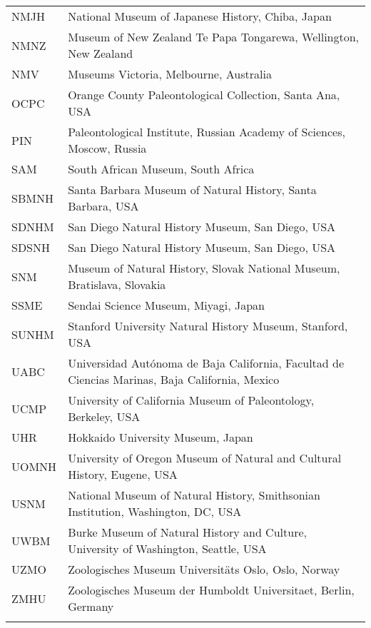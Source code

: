 \begin{longtable}{ll}
NMJH &
National Museum of Japanese History, Chiba, Japan\\
NMNZ &
Museum of New Zealand Te Papa Tongarewa, Wellington, New Zealand\\
NMV &
Museums Victoria, Melbourne, Australia\\
OCPC &
Orange County Paleontological Collection, Santa Ana, USA\\
PIN &
Paleontological Institute, Russian Academy of Sciences, Moscow, Russia\\
SAM &
South African Museum, South Africa\\
SBMNH &
Santa Barbara Museum of Natural History, Santa Barbara, USA\\
SDNHM &
San Diego Natural History Museum, San Diego, USA\\
SDSNH &
San Diego Natural History Museum, San Diego, USA\\
SNM &
Museum of Natural History, Slovak National Museum, Bratislava, Slovakia\\
SSME &
Sendai Science Museum, Miyagi, Japan\\
SUNHM &
Stanford University Natural History Museum, Stanford, USA\\
UABC &
Universidad Aut\'{o}noma de Baja California, Facultad de Ciencias Marinas, Baja California, Mexico\\
UCMP &
University of California Museum of Paleontology, Berkeley, USA\\
UHR &
Hokkaido University Museum, Japan\\
UOMNH &
University of Oregon Museum of Natural and Cultural History, Eugene, USA\\
USNM &
National Museum of Natural History, Smithsonian Institution, Washington, DC, USA\\
UWBM &
Burke Museum of Natural History and Culture, University of Washington, Seattle, USA\\
UZMO &
Zoologisches Museum Universit\"{a}ts Oslo, Oslo, Norway\\
ZMHU &
Zoologisches Museum der Humboldt Universitaet, Berlin, Germany\\
\hline

\label{table-institutions}
\end{longtable}
